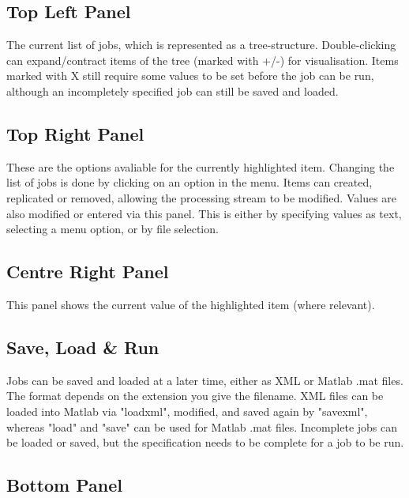 \documentclass[a4paper,titlepage]{book}
\begin{document}
\subsection*{Top Left Panel}

The current list of jobs, which is represented as a tree-structure. Double-clicking can expand/contract items of the tree (marked with +/-) for visualisation. Items marked with X still require some values to be set before the job can be run, although an incompletely specified job can still be saved and loaded.


\subsection*{Top Right Panel}

These are the options avaliable for the currently highlighted item. Changing the list of jobs is done by clicking on an option in the menu. Items can created, replicated or removed, allowing the processing stream to be modified. Values are also modified or entered via this panel. This is either by specifying values as text, selecting a menu option, or by file selection.


\subsection*{Centre Right Panel}

This panel shows the current value of the highlighted item (where relevant).


\subsection*{Save, Load \& Run}

Jobs can be saved and loaded at a later time, either as XML or Matlab .mat files.  The format depends on the extension you give the filename. XML files can be loaded into Matlab via "loadxml", modified, and saved again by "savexml", whereas "load" and "save" can be used for Matlab .mat files. Incomplete jobs can be loaded or saved, but the specification needs to be complete for a job to be run.


\subsection*{Bottom Panel}
\end{document}
